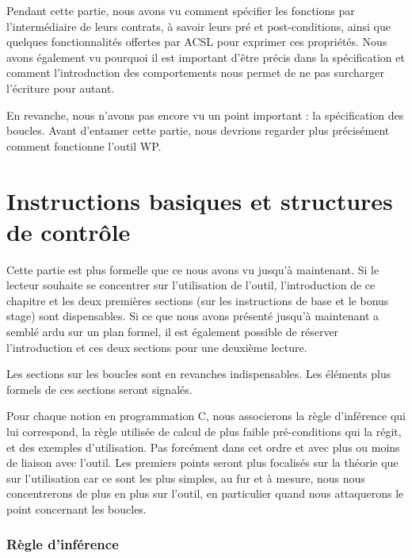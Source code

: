 \documentclass[12pt,francais,]{scrbook}
\newenvironment{zdsblock}[1]{%
  \tcolorbox[beamer,%
    noparskip,breakable,
    colback=LightBlue,colframe=DarkBlue,%
    colbacklower=DarkBlue,%
    title=#1]
}{\endtcolorbox}
\begin{document}
Pendant cette partie, nous avons vu comment spécifier les fonctions par
l'intermédiaire de leurs contrats, à savoir leurs pré et
post-conditions, ainsi que quelques fonctionnalités offertes par ACSL
pour exprimer ces propriétés. Nous avons également vu pourquoi il est
important d'être précis dans la spécification et comment l'introduction
des comportements nous permet de ne pas surcharger l'écriture pour
autant.

En revanche, nous n'avons pas encore vu un point important : la
spécification des boucles. Avant d'entamer cette partie, nous devrions
regarder plus précisément comment fonctionne l'outil WP.

\chapter{Instructions basiques et structures de
contrôle}\label{instructions-basiques-et-structures-de-contruxf4le}

\begin{zdsblock}{Information}
  Cette partie est plus formelle que ce
  nous avons vu jusqu'à maintenant. Si le lecteur souhaite se
  concentrer sur l'utilisation de l'outil, l'introduction de ce
  chapitre et les deux premières sections (sur les instructions de base et
  \og{}le bonus stage\fg{}) sont dispensables. Si ce que nous avons
  présenté jusqu'à maintenant a semblé ardu sur un plan
  formel, il est également possible de réserver l'introduction
  et ces deux sections pour une deuxième lecture.
  
  Les sections sur les boucles sont en revanches indispensables. Les
  éléments plus formels de ces sections seront signalés.
\end{zdsblock}

Pour chaque notion en programmation C, nous associerons la règle
d'inférence qui lui correspond, la règle utilisée de calcul de plus
faible pré-conditions qui la régit, et des exemples d'utilisation. Pas
forcément dans cet ordre et avec plus ou moins de liaison avec l'outil.
Les premiers points seront plus focalisés sur la théorie que sur
l'utilisation car ce sont les plus simples, au fur et à mesure, nous
nous concentrerons de plus en plus sur l'outil, en particulier quand
nous attaquerons le point concernant les boucles.

\subsection{Règle d'inférence}\label{ruxe8gle-dinfuxe9rence}
\end{document}
